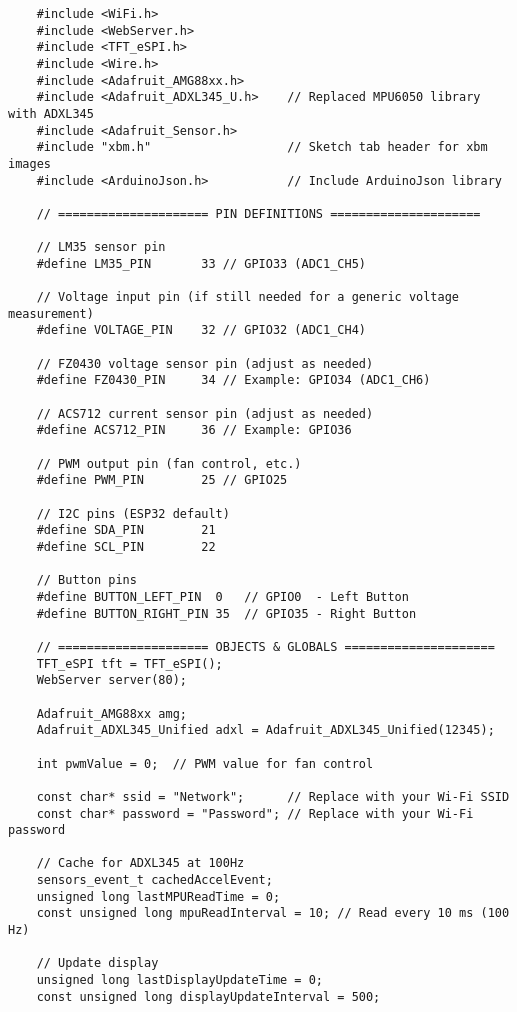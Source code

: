 \begin{verbatim}
    #include <WiFi.h>
    #include <WebServer.h>
    #include <TFT_eSPI.h>
    #include <Wire.h>
    #include <Adafruit_AMG88xx.h>
    #include <Adafruit_ADXL345_U.h>    // Replaced MPU6050 library with ADXL345
    #include <Adafruit_Sensor.h>
    #include "xbm.h"                   // Sketch tab header for xbm images
    #include <ArduinoJson.h>           // Include ArduinoJson library
    
    // ===================== PIN DEFINITIONS =====================
    
    // LM35 sensor pin
    #define LM35_PIN       33 // GPIO33 (ADC1_CH5)
    
    // Voltage input pin (if still needed for a generic voltage measurement)
    #define VOLTAGE_PIN    32 // GPIO32 (ADC1_CH4)
    
    // FZ0430 voltage sensor pin (adjust as needed)
    #define FZ0430_PIN     34 // Example: GPIO34 (ADC1_CH6)
    
    // ACS712 current sensor pin (adjust as needed)
    #define ACS712_PIN     36 // Example: GPIO36
    
    // PWM output pin (fan control, etc.)
    #define PWM_PIN        25 // GPIO25
    
    // I2C pins (ESP32 default)
    #define SDA_PIN        21
    #define SCL_PIN        22
    
    // Button pins
    #define BUTTON_LEFT_PIN  0   // GPIO0  - Left Button
    #define BUTTON_RIGHT_PIN 35  // GPIO35 - Right Button
    
    // ===================== OBJECTS & GLOBALS =====================
    TFT_eSPI tft = TFT_eSPI();
    WebServer server(80);
    
    Adafruit_AMG88xx amg;       
    Adafruit_ADXL345_Unified adxl = Adafruit_ADXL345_Unified(12345);
    
    int pwmValue = 0;  // PWM value for fan control
    
    const char* ssid = "Network";      // Replace with your Wi-Fi SSID
    const char* password = "Password"; // Replace with your Wi-Fi password
    
    // Cache for ADXL345 at 100Hz
    sensors_event_t cachedAccelEvent;
    unsigned long lastMPUReadTime = 0;
    const unsigned long mpuReadInterval = 10; // Read every 10 ms (100 Hz)
    
    // Update display
    unsigned long lastDisplayUpdateTime = 0;
    const unsigned long displayUpdateInterval = 500;
    

\end{verbatim}

